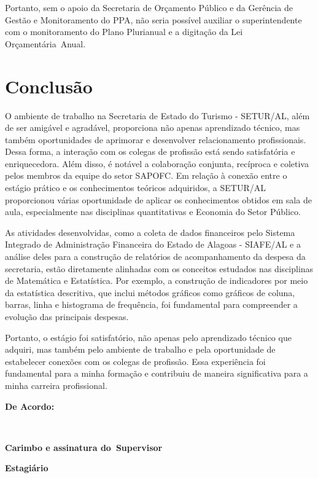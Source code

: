 \documentclass[12pt,a4paper]{article}
\begin{document}
	Portanto, sem o apoio da Secretaria de Orçamento Público e da Gerência de Gestão e Monitoramento do PPA, não seria possível auxiliar o superintendente com o monitoramento do Plano Plurianual e a digitação da Lei Orçamentária Anual.
	 
	\section{Conclusão}
	\hspace*{1,5cm} 
	O ambiente de trabalho na Secretaria de Estado do Turismo - SETUR/AL, além de ser amigável e agradável, proporciona não apenas aprendizado técnico, mas também oportunidades de aprimorar e desenvolver relacionamento profissionais. Dessa forma, a interação com os colegas de profissão está sendo satisfatória e enriquecedora. Além disso, é notável a colaboração conjunta, recíproca e coletiva pelos membros da equipe do setor SAPOFC. Em relação à conexão entre o estágio prático e os conhecimentos teóricos adquiridos, a SETUR/AL proporcionou várias oportunidade de aplicar os conhecimentos obtidos em sala de aula, especialmente nas disciplinas quantitativas e  Economia do Setor Público. 
	
	As atividades desenvolvidas, como a coleta de dados financeiros pelo Sistema Integrado de Administração Financeira do Estado de Alagoas - SIAFE/AL e a análise deles para a construção de relatórios de acompanhamento da despesa da secretaria, estão diretamente alinhadas com os conceitos estudados nas disciplinas de Matemática e Estatística. Por exemplo, a construção de indicadores por meio da estatística descritiva, que inclui métodos gráficos como gráficos de coluna, barras, linha e histograma de frequência, foi fundamental para compreender a evolução das principais despesas. 
	
	Portanto, o estágio foi satisfatório, não apenas pelo aprendizado técnico que adquiri, mas também pelo ambiente de trabalho e pela oportunidade de estabelecer conexões com os colegas de profissão. Essa experiência foi fundamental para a minha formação e contribuiu de maneira significativa para a minha carreira profissional.

	

	
	\newpage
	\vspace{2cm}
	\noindent \textbf{De Acordo:}
	
	\vfill

	\noindent
	\underline{\hspace{7cm}} \hfill \underline{\hspace{7cm}} \\[0.3cm]

	\begin{minipage}[t]{7cm}
		\centering
		\textbf{Carimbo e assinatura do\
		Supervisor}
	\end{minipage}
		\hfill
	\begin{minipage}[t]{7cm}
		\centering
		\textbf{Estagiário}
	\end{minipage}

	
\end{document}
